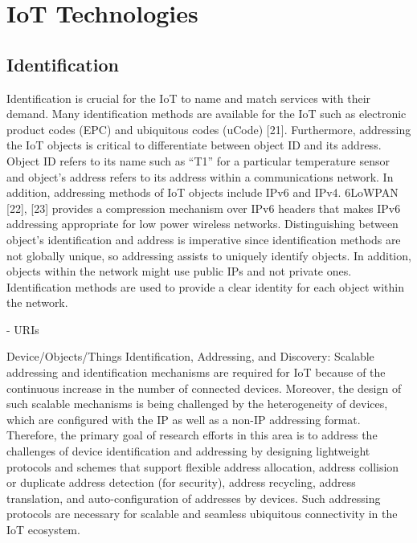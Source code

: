 \section{IoT Technologies}



\subsection{Identification}

Identification is crucial for the IoT to name and match
services with their demand. Many identification methods are
available for the IoT such as electronic product codes (EPC) and
ubiquitous codes (uCode) [21]. Furthermore, addressing the
IoT objects is critical to differentiate between object ID and its
address. Object ID refers to its name such as “T1” for a particular
temperature sensor and object’s address refers to its address
within a communications network. In addition, addressing
methods of IoT objects include IPv6 and IPv4. 6LoWPAN [22],
[23] provides a compression mechanism over IPv6 headers
that makes IPv6 addressing appropriate for low power wireless
networks. Distinguishing between object’s identification and
address is imperative since identification methods are not globally
unique, so addressing assists to uniquely identify objects.
In addition, objects within the network might use public IPs
and not private ones. Identification methods are used to provide
a clear identity for each object within the network.

- URIs 

Device/Objects/Things Identification, Addressing, and
Discovery: Scalable addressing and identification mechanisms
are required for IoT because of the continuous increase in the
number of connected devices. Moreover, the design of such
scalable mechanisms is being challenged by the heterogeneity
of devices, which are configured with the IP as well as
a non-IP addressing format. Therefore, the primary goal of
research efforts in this area is to address the challenges of
device identification and addressing by designing lightweight
protocols and schemes that support flexible address allocation,
address collision or duplicate address detection (for security),
address recycling, address translation, and auto-configuration
of addresses by devices. Such addressing protocols are necessary
for scalable and seamless ubiquitous connectivity in the
IoT ecosystem.

